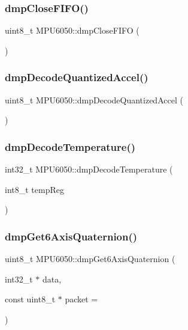 \subsubsection{\texorpdfstring{dmpCloseFIFO()}{dmpCloseFIFO()}}
{\footnotesize\ttfamily uint8\+\_\+t M\+P\+U6050\+::dmp\+Close\+F\+I\+FO (\begin{DoxyParamCaption}{ }\end{DoxyParamCaption})}

\mbox{\label{classMPU6050_a39ed46d7a593d93fbf147318331dd655}} 
\subsubsection{\texorpdfstring{dmpDecodeQuantizedAccel()}{dmpDecodeQuantizedAccel()}}
{\footnotesize\ttfamily uint8\+\_\+t M\+P\+U6050\+::dmp\+Decode\+Quantized\+Accel (\begin{DoxyParamCaption}{ }\end{DoxyParamCaption})}

\mbox{\label{classMPU6050_ae15d6ac608ea2f4758aecd3a884e6014}} 
\subsubsection{\texorpdfstring{dmpDecodeTemperature()}{dmpDecodeTemperature()}}
{\footnotesize\ttfamily int32\+\_\+t M\+P\+U6050\+::dmp\+Decode\+Temperature (\begin{DoxyParamCaption}\item[{int8\+\_\+t}]{temp\+Reg }\end{DoxyParamCaption})}

\mbox{\label{classMPU6050_a776c9ba67375bfe59432e7f78c7eab87}} 
\subsubsection{\texorpdfstring{dmpGet6AxisQuaternion()}{dmpGet6AxisQuaternion()}\hspace{0.1cm}{\footnotesize\ttfamily [1/3]}}
{\footnotesize\ttfamily uint8\+\_\+t M\+P\+U6050\+::dmp\+Get6\+Axis\+Quaternion (\begin{DoxyParamCaption}\item[{int32\+\_\+t $\ast$}]{data,  }\item[{const uint8\+\_\+t $\ast$}]{packet = {} }\end{DoxyParamCaption})}

